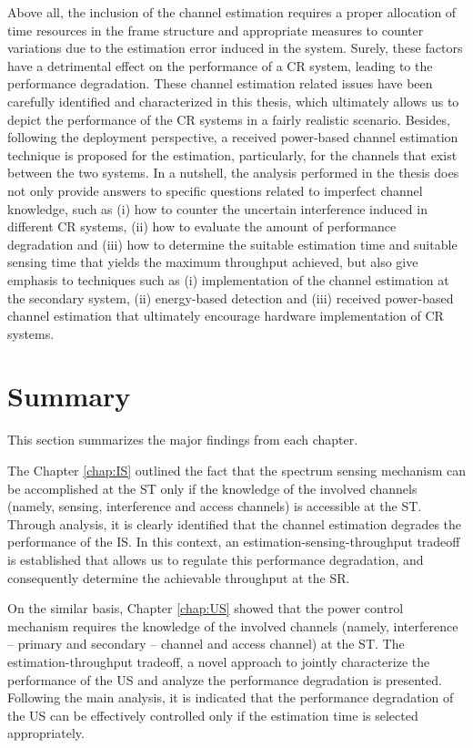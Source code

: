 Above all, the inclusion of the channel estimation requires a proper allocation of time resources in the frame structure and appropriate measures to counter variations due to the estimation error induced in the system. Surely, these factors have a detrimental effect on the performance of a CR system, leading to the performance degradation. These channel estimation related issues have been carefully identified and characterized in this thesis, which ultimately allows us to depict the performance of the CR systems in a fairly realistic scenario. Besides, following the deployment perspective, a received power-based channel estimation technique is proposed for the estimation, particularly, for the channels that exist between the two systems. In a nutshell, the analysis performed in the thesis does not only provide answers to specific questions related to imperfect channel knowledge, such as (i) how to counter the uncertain interference induced in different CR systems, (ii) how to evaluate the amount of performance degradation and (iii) how to determine the suitable estimation time and suitable sensing time that yields the maximum throughput achieved, but also give emphasis to techniques such as (i) implementation of the channel estimation at the secondary system, (ii) energy-based detection and (iii) received power-based channel estimation that ultimately encourage hardware implementation of CR systems. 


\section{Summary}
This section summarizes the major findings from each chapter. 

The Chapter \ref{chap:IS} outlined the fact that the spectrum sensing mechanism can be accomplished at the ST only if the knowledge of the involved channels (namely, sensing, interference and access channels) is accessible at the ST. Through analysis, it is clearly identified that the channel estimation degrades the performance of the IS. In this context, an estimation-sensing-throughput tradeoff is established that allows us to regulate this performance degradation, and consequently determine the achievable throughput at the SR.

On the similar basis, Chapter \ref{chap:US} showed that the power control mechanism requires the knowledge of the involved channels (namely, interference -- primary and secondary -- channel and access channel) at the ST. The estimation-throughput tradeoff, a novel approach to jointly characterize the performance of the US and analyze the performance degradation is presented. Following the main analysis, it is indicated that the performance degradation of the US can be effectively controlled only if the estimation time is selected appropriately.   

